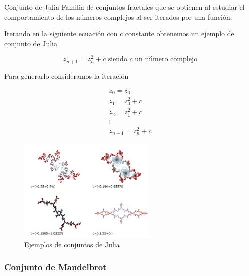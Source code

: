 \documentclass[8pt]{beamer}
\begin{document}
\begin{frame}
\begin{block}{Conjunto de Julia}
Familia de conjuntos fractales que se obtienen al estudiar el comportamiento de los números complejos al ser iterados por una función.

Iterando en la siguiente ecuación con $c$ constante obtenemos un ejemplo de conjunto de Julia

\begin{equation}
z_{n+1} = z_n^2+c \text{ siendo } c \text{ un número complejo}
\end{equation}\label{eq:Julia}
\end{block}

Para generarlo consideramos la iteración

\begin{minipage}{0.3\textwidth}
\[\begin{array}{l}
z_0=z_0\\
z_1=z_0^2+c \\
z_2 = z_1^2 + c \\
\vdots \\
z_{n+1} = z_n^2+c
\end{array}\]
\end{minipage}
\begin{minipage}{0.68\textwidth}
\begin{figure}[hbtp]
\centering
\includegraphics[width = 0.6\textwidth]{img/Julia_sets.png}
\caption{Ejemplos de conjuntos de Julia}
\label{fig:Julia}
\end{figure}
\end{minipage}
\end{frame}

\subsubsection{Conjunto de Mandelbrot}
\end{document}

